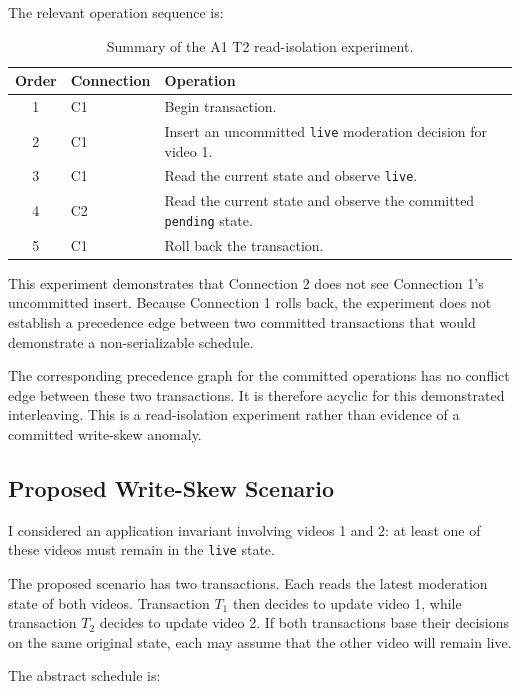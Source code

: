 \documentclass[11pt,a4paper]{article}
\begin{document}
The relevant operation sequence is:

\begin{table}[H]
\centering
\small
\begin{tabular}{clp{8cm}}
\toprule
\textbf{Order} & \textbf{Connection} & \textbf{Operation} \\
\midrule
1 & C1 & Begin transaction. \\
2 & C1 & Insert an uncommitted \texttt{live} moderation decision
for video 1. \\
3 & C1 & Read the current state and observe \texttt{live}. \\
4 & C2 & Read the current state and observe the committed
\texttt{pending} state. \\
5 & C1 & Roll back the transaction. \\
\bottomrule
\end{tabular}
\caption{Summary of the A1 T2 read-isolation experiment.}
\end{table}

This experiment demonstrates that Connection 2 does not see
Connection 1's uncommitted insert. Because Connection 1 rolls back,
the experiment does not establish a precedence edge between two
committed transactions that would demonstrate a non-serializable
schedule.

The corresponding precedence graph for the committed operations
has no conflict edge between these two transactions. It is
therefore acyclic for this demonstrated interleaving. This is a
read-isolation experiment rather than evidence of a committed
write-skew anomaly.

\subsection{Proposed Write-Skew Scenario}

I considered an application invariant involving videos 1 and 2:
at least one of these videos must remain in the \texttt{live} state.

The proposed scenario has two transactions. Each reads the latest
moderation state of both videos. Transaction \(T_1\) then decides
to update video 1, while transaction \(T_2\) decides to update
video 2. If both transactions base their decisions on the same
original state, each may assume that the other video will remain
live.

The abstract schedule is:
\end{document}
